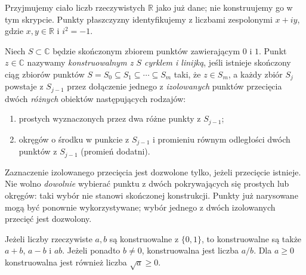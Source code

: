 Przyjmujemy ciało liczb rzeczywistych $\mathbb R$ jako już
dane; nie konstruujemy go w tym skrypcie. Punkty płaszczyzny
identyfikujemy z liczbami zespolonymi $x+iy$, gdzie
$x,y\in\mathbb R$ i $i^2=-1$.
\begin{definicja}\label{aa:def:constructible}
Niech $S\subset\mathbb C$ będzie skończonym zbiorem punktów
zawierającym $0$ i $1$. Punkt $z\in\mathbb C$ nazywamy
\emph{konstruowalnym z $S$ cyrklem i linijką}, jeśli istnieje
skończony ciąg zbiorów punktów
$S=S_0\subseteq S_1\subseteq\cdots\subseteq S_m$
taki, że $z\in S_m$, a każdy zbiór $S_j$ powstaje
z $S_{j-1}$ przez dołączenie jednego z \emph{izolowanych}
punktów przecięcia dwóch \emph{różnych} obiektów
następujących rodzajów:
\begin{enumerate}
\item prostych wyznaczonych przez dwa różne punkty
      z $S_{j-1}$;
\item okręgów o środku w punkcie z $S_{j-1}$
      i promieniu równym odległości dwóch punktów
      z $S_{j-1}$ (promień dodatni).
\end{enumerate}
Zaznaczenie izolowanego przecięcia jest dozwolone tylko,
jeżeli przecięcie istnieje. Nie wolno \emph{dowolnie} wybierać
punktu z dwóch pokrywających się prostych lub okręgów:
taki wybór nie stanowi skończonej konstrukcji.
Punkty już narysowane mogą być ponownie wykorzystywane;
wybór jednego z dwóch izolowanych przecięć jest dozwolony.
\end{definicja}
\begin{lemat}
\label{aa:lem:constructibility-field-operations}
Jeżeli liczby rzeczywiste $a,b$ są konstruowalne z $\{0,1\}$,
to konstruowalne są także $a+b$, $a-b$ i $ab$.
Jeżeli ponadto $b\ne0$, konstruowalna jest liczba $a/b$.
Dla $a\ge0$ konstruowalna jest również liczba $\sqrt a\ge0$.
\end{lemat}

